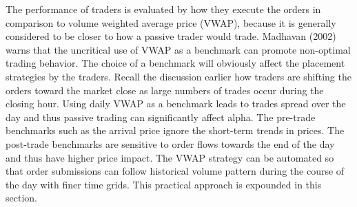 The performance of traders is evaluated by how they execute the orders in comparison to volume weighted average price (VWAP), because it is generally considered to be closer to how a passive trader would trade. Madhavan (2002)~\cite{mad_a02} warns that the uncritical use of VWAP as a benchmark can promote non-optimal trading behavior. The choice of a benchmark will obviously affect the placement strategies by the traders. Recall the discussion earlier how traders are shifting the orders toward the market close as large numbers of trades occur during the closing hour. Using daily VWAP as a benchmark leads to trades spread over the day and thus passive trading can significantly affect alpha. The pre-trade benchmarks such as the arrival price ignore the short-term trends in prices. The post-trade benchmarks are sensitive to order flows towards the end of the day and thus have higher price impact. The VWAP strategy can be automated so that order submissions can follow historical volume pattern during the course of the day with finer time grids. This practical approach is expounded in this section.


